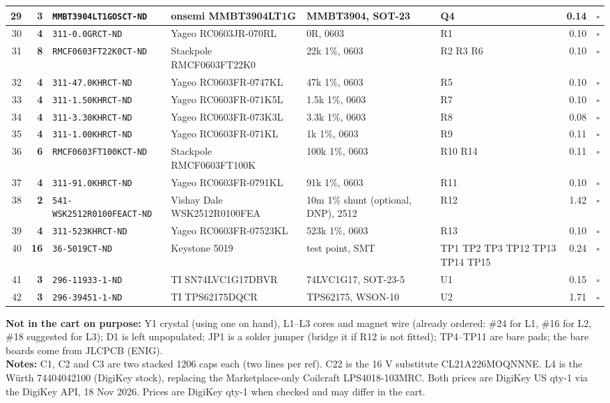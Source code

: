 \documentclass[10pt]{article}
\begin{document}
\begin{longtable}{|r|r|>{\raggedright}p{1.9in}|>{\raggedright}p{2.3in}|>{\raggedright}p{1.7in}|>{\raggedright}p{1.15in}|r|c|}
29 & \textbf{3} & \texttt{MMBT3904LT1GOSCT-ND} & onsemi MMBT3904LT1G & MMBT3904, SOT-23 & Q4 & 0.14 & $\square$\\ \hline
30 & \textbf{4} & \texttt{311-0.0GRCT-ND} & Yageo RC0603JR-070RL & 0R, 0603 & R1 & 0.10 & $\square$\\ \hline
31 & \textbf{8} & \texttt{RMCF0603FT22K0CT-ND} & Stackpole RMCF0603FT22K0 & 22k 1\%, 0603 & R2 R3 R6 & 0.10 & $\square$\\ \hline
32 & \textbf{4} & \texttt{311-47.0KHRCT-ND} & Yageo RC0603FR-0747KL & 47k 1\%, 0603 & R5 & 0.10 & $\square$\\ \hline
33 & \textbf{4} & \texttt{311-1.50KHRCT-ND} & Yageo RC0603FR-071K5L & 1.5k 1\%, 0603 & R7 & 0.10 & $\square$\\ \hline
34 & \textbf{4} & \texttt{311-3.30KHRCT-ND} & Yageo RC0603FR-073K3L & 3.3k 1\%, 0603 & R8 & 0.08 & $\square$\\ \hline
35 & \textbf{4} & \texttt{311-1.00KHRCT-ND} & Yageo RC0603FR-071KL & 1k 1\%, 0603 & R9 & 0.11 & $\square$\\ \hline
36 & \textbf{6} & \texttt{RMCF0603FT100KCT-ND} & Stackpole RMCF0603FT100K & 100k 1\%, 0603 & R10 R14 & 0.11 & $\square$\\ \hline
37 & \textbf{4} & \texttt{311-91.0KHRCT-ND} & Yageo RC0603FR-0791KL & 91k 1\%, 0603 & R11 & 0.10 & $\square$\\ \hline
38 & \textbf{2} & \texttt{541-WSK2512R0100FEACT-ND} & Vishay Dale WSK2512R0100FEA & 10m 1\% shunt (optional, DNP), 2512 & R12 & 1.42 & $\square$\\ \hline
39 & \textbf{4} & \texttt{311-523KHRCT-ND} & Yageo RC0603FR-07523KL & 523k 1\%, 0603 & R13 & 0.10 & $\square$\\ \hline
40 & \textbf{16} & \texttt{36-5019CT-ND} & Keystone 5019 & test point, SMT & TP1 TP2 TP3 TP12 TP13 TP14 TP15 & 0.24 & $\square$\\ \hline
41 & \textbf{3} & \texttt{296-11933-1-ND} & TI SN74LVC1G17DBVR & 74LVC1G17, SOT-23-5 & U1 & 0.15 & $\square$\\ \hline
42 & \textbf{3} & \texttt{296-39451-1-ND} & TI TPS62175DQCR & TPS62175, WSON-10 & U2 & 1.71 & $\square$\\ \hline
\end{longtable}
\textbf{Not in the cart on purpose:} Y1 crystal (using one on hand), L1--L3 cores and magnet wire (already ordered: \#24 for L1, \#16 for L2, \#18 suggested for L3); D1 is left unpopulated; JP1 is a solder jumper (bridge it if R12 is not fitted); TP4--TP11 are bare pads; the bare boards come from JLCPCB (ENIG).\\[3pt]
\textbf{Notes:} C1, C2 and C3 are two stacked 1206 caps each (two lines per ref). C22 is the 16 V substitute CL21A226MOQNNNE. L4 is the W\"urth 74404042100 (DigiKey stock), replacing the Marketplace-only Coilcraft LPS4018-103MRC. Both prices are DigiKey US qty-1 via the DigiKey API, 18 Nov 2026. Prices are DigiKey qty-1 when checked and may differ in the cart.
\end{document}
